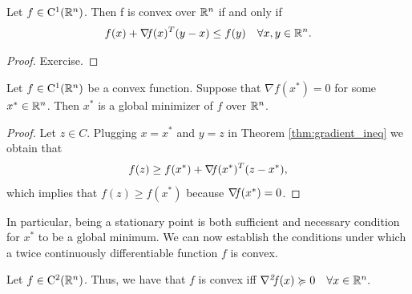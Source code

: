 \documentclass[10pt,a4paper]{article}
\begin{document}
\begin{theorem}\label{thm:gradient_ineq}
	Let $f\in \mathord{\mathrm{C^1}}(\mathbb{R}^n)$. Then f is convex over $\mathbb{R}^n$ if and only if
	\begin{equation}\label{eq:grad_ineq}
		f(x) +\operatorname*{\mathit{\nabla \!f}}(x)^T(y-x)\leq f(y) \quad \forall x, y\in \mathbb{R}^n.
	\end{equation}
\end{theorem}
\begin{proof}
	Exercise.
\end{proof}
\begin{proposition}\label{prop:stationarity}
	Let $f\in \mathord{\mathrm{C^1}}(\mathbb{R}^n)$ be a convex function. Suppose that $\nabla f(x^*)=0$ for some $x^*\in \mathbb{R}^n$. Then $x^*$ is a global minimizer of $f$ over $\mathbb{R}^n$.
\end{proposition}
\begin{proof}
	Let $z\in C$. Plugging $x=x^*$ and $y=z$ in Theorem \ref{thm:gradient_ineq} we obtain that 
	\begin{equation*}
		f(z)\geq f(x^*) +\operatorname*{\mathit{\nabla \!f}}(x^*)^T(z-x^*),
	\end{equation*}
	which implies that $f(z)\geq f(x^*) $ because $\operatorname*{\mathit{\nabla \!f}}(x^*)=0$.
\end{proof}
In particular, being a stationary point is both sufficient and necessary condition for $x^*$ to be a global minimum.
We can now establish the conditions under which a twice continuously differentiable function $f$ is convex.
\begin{theorem}
	Let $f\in \mathord{\mathrm{C^2}}(\mathbb{R}^n)$. Thus, we have that $f$ is convex iff $\operatorname*{\mathit{\nabla^2 \!f}}(x)\succcurlyeq0\quad \forall x\in \mathbb{R}^n.$
\end{theorem}
\end{document}
